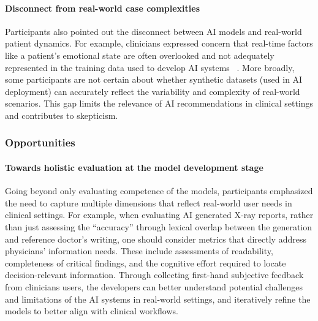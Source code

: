 

\paragraph{Disconnect from real-world case complexities} Participants also pointed out the disconnect between AI models and real-world patient dynamics. 
For example, clinicians expressed concern that real-time factors like a patient’s emotional state are often overlooked and not adequately represented in the training data used to develop AI systems ~\citep{chan2023assessingusabilitygutgptsimulation}. 
More broadly, some participants are not certain about whether synthetic datasets (used in AI deployment) can accurately reflect the variability and complexity of real-world scenarios. 
This gap limits the relevance of AI recommendations in clinical settings and contributes to skepticism. 

\subsubsection{Opportunities} 

\paragraph{Towards holistic evaluation at the model development stage} 
Going beyond only evaluating competence of the models, participants emphasized the need to capture multiple dimensions that reflect real-world user needs in clinical settings. 
For example, when evaluating AI generated X-ray reports, rather than just assessing the ``accuracy'' through lexical overlap between the generation and reference doctor's writing, one should consider metrics that directly address physicians' information needs. 
These include assessments of readability, completeness of critical findings, and the cognitive effort required to locate decision-relevant information.
Through collecting first-hand subjective feedback from clinicians users, the developers can better understand potential challenges and limitations of the AI systems in real-world settings, and iteratively refine the models to better align with clinical workflows.


